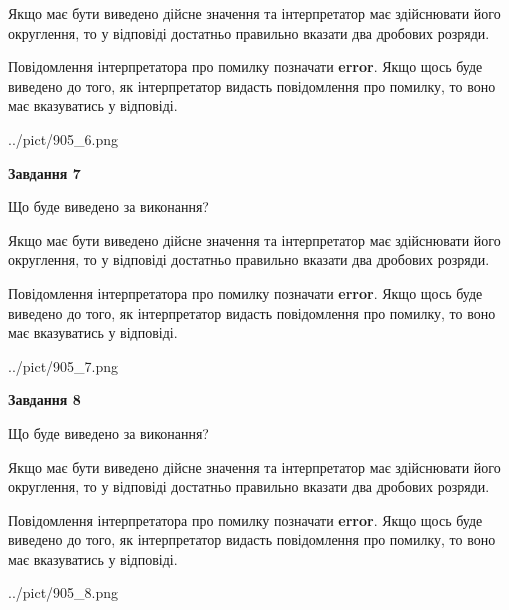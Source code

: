 \documentclass[12pt, ukrainian]{article}
\begin{document}
{\begin {Large}
Якщо має бути виведено дійсне значення та інтерпретатор має здійснювати його округлення, 
то у відповіді достатньо правильно вказати два дробових розряди.

Повідомлення інтерпретатора про помилку позначати \textbf{error}.
Якщо щось буде виведено до того, як інтерпретатор видасть повідомлення про помилку, 
то воно має вказуватись у відповіді. \par

\begin{center}
	{../pict/905_6.png}
\end{center}
\newpage

{\begin {center}\textbf{Завдання 7}\end {center}}\par
Що буде виведено за виконання? \par

Якщо має бути виведено дійсне значення та інтерпретатор має здійснювати його округлення, 
то у відповіді достатньо правильно вказати два дробових розряди.

Повідомлення інтерпретатора про помилку позначати \textbf{error}.
Якщо щось буде виведено до того, як інтерпретатор видасть повідомлення про помилку, 
то воно має вказуватись у відповіді. \par

\begin{center}
	{../pict/905_7.png}
\end{center}
\newpage

{\begin {center}\textbf{Завдання 8}\end {center}}\par
Що буде виведено за виконання? \par

Якщо має бути виведено дійсне значення та інтерпретатор має здійснювати його округлення, 
то у відповіді достатньо правильно вказати два дробових розряди.

Повідомлення інтерпретатора про помилку позначати \textbf{error}.
Якщо щось буде виведено до того, як інтерпретатор видасть повідомлення про помилку, 
то воно має вказуватись у відповіді. \par

\begin{center}
	{../pict/905_8.png}
\end{center}
\newpage


\end{Large}}
\end{document}
